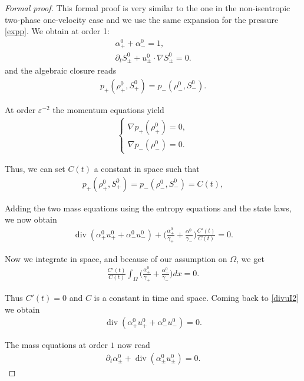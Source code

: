 \documentclass[10pt,a4paper]{amsart}
\newcommand{\am}{\alpha_-}
\newcommand{\ap}{\alpha_+}
\renewcommand{\div}{\operatorname{div}}
\newcommand{\dt}{\partial_t}
\newcommand{\eps}{\varepsilon}
\newcommand{\gm}{\gamma_-}
\newcommand{\gp}{\gamma_{+}}
\newcommand{\rmi}{\rho_-}
\newcommand{\rp}{\rho_+}
\begin{document}
\begin{proof}[Formal proof]
This formal proof is very similar to the one in the non-isentropic two-phase one-velocity case and we use the same expansion for the pressure \eqref{expp}. We obtain at order 1:
\begin{align*}
    \ap^0 + \am^0 = 1,\\
    \dt S_\pm^0 + u_\pm^0 \cdot \nabla S_\pm^0 = 0.
\end{align*}
and the algebraic closure reads
\begin{align*}
    p_+ (\rp^0,S_+^0) = p_-(\rmi^0,S_-^0).
\end{align*}

At order $\eps^{-2}$ the momentum equations yield
\begin{align*}
    \left\{
        \begin{array}{l}
              \nabla p_+(\rho_+^0) = 0, \\
              \nabla p_-(\rho_-^0) = 0.
        \end{array}
    \right.
\end{align*}

Thus, we can set $C(t)$ a constant in space such that
\begin{align*}
     p_+ (\rp^0,S_+^0) = p_-(\rmi^0,S_-^0) = C(t),
\end{align*}

Adding the two mass equations using the entropy equations and the state laws, we now obtain
\begin{align}
    \div (\ap^0 u_+^0 + \am^0 u_-^0) + \Big( \frac{\ap^0}{\gp} + \frac{\am^0}{\gm} \Big) \frac{C'(t)}{C(t)}=0.\label{divuI2}
\end{align}

Now we integrate in space, and because of our assumption on $\Omega$, we get
\begin{align*}
    \frac{C'(t)}{C(t)}\int_\Omega \Big( \frac{\ap^0}{\gp} + \frac{\am^0}{\gm} \Big) d x   =0.
\end{align*}

Thus $C'(t) = 0$ and $C$ is a constant in time and space. Coming back to \eqref{divuI2} we obtain
\begin{align*}
    \div (\ap^0 u_+^0 + \am^0 u_-^0) = 0.
\end{align*}



The mass equations at order $1$ now read
\begin{align*}
    \dt \alpha_\pm^0 + \div (\alpha_\pm^0 u_\pm^0)=0.
\end{align*}


\end{proof}
\end{document}

